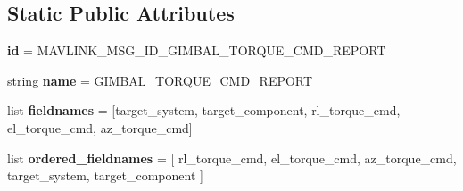 \subsection*{Static Public Attributes}
\begin{DoxyCompactItemize}
\item 
\mbox{\label{classpymavlink_1_1dialects_1_1v10_1_1MAVLink__gimbal__torque__cmd__report__message_aa330f0e6b3d528629230b8d983bbbcb9}} 
{\bfseries id} = M\+A\+V\+L\+I\+N\+K\+\_\+\+M\+S\+G\+\_\+\+I\+D\+\_\+\+G\+I\+M\+B\+A\+L\+\_\+\+T\+O\+R\+Q\+U\+E\+\_\+\+C\+M\+D\+\_\+\+R\+E\+P\+O\+RT
\item 
\mbox{\label{classpymavlink_1_1dialects_1_1v10_1_1MAVLink__gimbal__torque__cmd__report__message_a8823ec59646988fb332b3510d54b09a3}} 
string {\bfseries name} = \textquotesingle{}G\+I\+M\+B\+A\+L\+\_\+\+T\+O\+R\+Q\+U\+E\+\_\+\+C\+M\+D\+\_\+\+R\+E\+P\+O\+RT\textquotesingle{}
\item 
\mbox{\label{classpymavlink_1_1dialects_1_1v10_1_1MAVLink__gimbal__torque__cmd__report__message_a0db281526a4265335e7540ba6b102a3b}} 
list {\bfseries fieldnames} = \mbox{[}\textquotesingle{}target\+\_\+system\textquotesingle{}, \textquotesingle{}target\+\_\+component\textquotesingle{}, \textquotesingle{}rl\+\_\+torque\+\_\+cmd\textquotesingle{}, \textquotesingle{}el\+\_\+torque\+\_\+cmd\textquotesingle{}, \textquotesingle{}az\+\_\+torque\+\_\+cmd\textquotesingle{}\mbox{]}
\item 
\mbox{\label{classpymavlink_1_1dialects_1_1v10_1_1MAVLink__gimbal__torque__cmd__report__message_a160e5165d5eb07fb10818f488a810cb4}} 
list {\bfseries ordered\+\_\+fieldnames} = \mbox{[} \textquotesingle{}rl\+\_\+torque\+\_\+cmd\textquotesingle{}, \textquotesingle{}el\+\_\+torque\+\_\+cmd\textquotesingle{}, \textquotesingle{}az\+\_\+torque\+\_\+cmd\textquotesingle{}, \textquotesingle{}target\+\_\+system\textquotesingle{}, \textquotesingle{}target\+\_\+component\textquotesingle{} \mbox{]}
\item 
\mbox{\label{classpymavlink_1_1dialects_1_1v10_1_1MAVLink__gimbal__torque__cmd__report__message_ab3cb9e58e5e9a1a46b29448735f6e693}} 

\end{DoxyCompactItemize}
